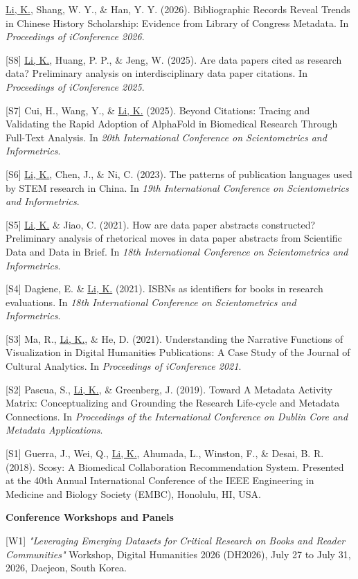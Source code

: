 \documentclass[margin, 10pt]{res} %
\begin{document}
\begin{resume}
[S9] \underline{Li, K.}, Shang, W. Y., \& Han, Y. Y. (2026). Bibliographic Records Reveal Trends in Chinese History Scholarship: Evidence from Library of Congress Metadata. In \textit{Proceedings of iConference 2026}.

[S8] \underline{Li, K.}, Huang, P. P., \& Jeng, W. (2025). Are data papers cited as research data? Preliminary analysis on interdisciplinary data paper citations. In \textit{Proceedings of iConference 2025}.

[S7] Cui, H., Wang, Y., \& \underline{Li, K.} (2025). Beyond Citations: Tracing and Validating the Rapid Adoption of AlphaFold in Biomedical Research Through Full-Text Analysis. In \textit{20th International Conference on Scientometrics and Informetrics}.

[S6] \underline{Li, K.}, Chen, J., \& Ni, C. (2023). The patterns of publication languages used by STEM research in China. In \textit{19th International Conference on Scientometrics and Informetrics}.

[S5] \underline{Li, K.} \& Jiao, C. (2021). How are data paper abstracts constructed? Preliminary analysis of rhetorical moves in data paper abstracts from Scientific Data and Data in Brief. In \textit{18th International Conference on Scientometrics and Informetrics}.

[S4] Dagiene, E. \& \underline{Li, K.} (2021). ISBNs as identifiers for books in research evaluations. In \textit{18th International Conference on Scientometrics and Informetrics}.

[S3] Ma, R., \underline{Li, K.}, \& He, D. (2021). Understanding the Narrative Functions of Visualization in Digital Humanities Publications: A Case Study of the Journal of Cultural Analytics. In \textit{Proceedings of iConference 2021}.

[S2] Pascua, S., \underline{Li, K.}, \& Greenberg, J. (2019). Toward A Metadata Activity Matrix: Conceptualizing and Grounding the Research Life-cycle and Metadata Connections. In \textit{Proceedings of the International Conference on Dublin Core and Metadata Applications}.

[S1] Guerra, J., Wei, Q., \underline{Li, K.}, Ahumada, L., Winston, F., \& Desai, B. R. (2018). Scosy: A Biomedical Collaboration Recommendation System. Presented at the 40th Annual International Conference of the IEEE Engineering in Medicine and Biology Society (EMBC), Honolulu, HI, USA.

\textbf{Conference Workshops and Panels}

[W1] \textit{"Leveraging Emerging Datasets for Critical Research on Books and Reader Communities"} Workshop, Digital Humanities 2026 (DH2026), July 27 to July 31, 2026, Daejeon, South Korea.


\end{resume}
\end{document}
